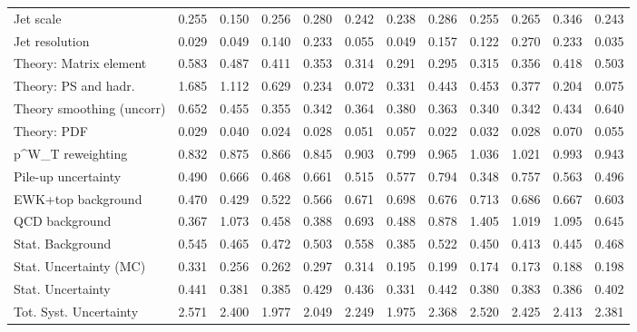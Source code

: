\begin{tabular}{l|p{0.6cm}p{0.6cm}p{0.6cm}p{0.6cm}p{0.6cm}p{0.6cm}p{0.6cm}p{0.6cm}p{0.6cm}p{0.6cm}p{0.6cm}}
Jet scale                                & 0.255 & 0.150 & 0.256 & 0.280 & 0.242 & 0.238 & 0.286 & 0.255 & 0.265 & 0.346 & 0.243 \\
Jet resolution                           & 0.029 & 0.049 & 0.140 & 0.233 & 0.055 & 0.049 & 0.157 & 0.122 & 0.270 & 0.233 & 0.035 \\
Theory: Matrix element                   & 0.583 & 0.487 & 0.411 & 0.353 & 0.314 & 0.291 & 0.295 & 0.315 & 0.356 & 0.418 & 0.503 \\
Theory: PS and hadr.                     & 1.685 & 1.112 & 0.629 & 0.234 & 0.072 & 0.331 & 0.443 & 0.453 & 0.377 & 0.204 & 0.075 \\
Theory smoothing (uncorr)                & 0.652 & 0.455 & 0.355 & 0.342 & 0.364 & 0.380 & 0.363 & 0.340 & 0.342 & 0.434 & 0.640 \\
Theory: PDF                              & 0.029 & 0.040 & 0.024 & 0.028 & 0.051 & 0.057 & 0.022 & 0.032 & 0.028 & 0.070 & 0.055 \\
p^{W}_{T} reweighting                    & 0.832 & 0.875 & 0.866 & 0.845 & 0.903 & 0.799 & 0.965 & 1.036 & 1.021 & 0.993 & 0.943 \\
Pile-up uncertainty                      & 0.490 & 0.666 & 0.468 & 0.661 & 0.515 & 0.577 & 0.794 & 0.348 & 0.757 & 0.563 & 0.496 \\
EWK+top background                       & 0.470 & 0.429 & 0.522 & 0.566 & 0.671 & 0.698 & 0.676 & 0.713 & 0.686 & 0.667 & 0.603 \\
QCD background                           & 0.367 & 1.073 & 0.458 & 0.388 & 0.693 & 0.488 & 0.878 & 1.405 & 1.019 & 1.095 & 0.645 \\
Stat. Background                         & 0.545 & 0.465 & 0.472 & 0.503 & 0.558 & 0.385 & 0.522 & 0.450 & 0.413 & 0.445 & 0.468 \\
Stat. Uncertainty (MC)                   & 0.331 & 0.256 & 0.262 & 0.297 & 0.314 & 0.195 & 0.199 & 0.174 & 0.173 & 0.188 & 0.198 \\
\hline
Stat. Uncertainty                        & 0.441 & 0.381 & 0.385 & 0.429 & 0.436 & 0.331 & 0.442 & 0.380 & 0.383 & 0.386 & 0.402 \\
\hline
Tot. Syst. Uncertainty                   & 2.571 & 2.400 & 1.977 & 2.049 & 2.249 & 1.975 & 2.368 & 2.520 & 2.425 & 2.413 & 2.381 \\
\hline
\end{tabular}
